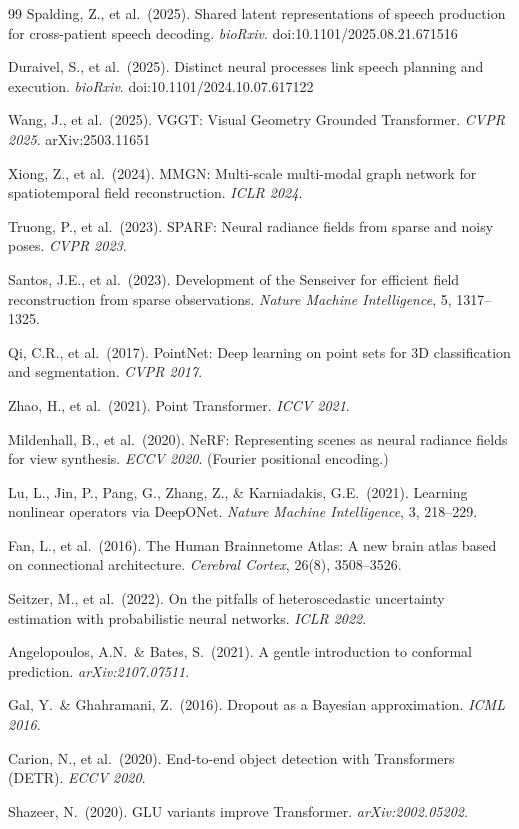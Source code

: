 \documentclass[11pt,letterpaper]{article}
\begin{document}
\begin{thebibliography}{99}
Spalding, Z., et al.\ (2025).
Shared latent representations of speech production for cross-patient speech decoding.
\textit{bioRxiv}. doi:10.1101/2025.08.21.671516

Duraivel, S., et al.\ (2025).
Distinct neural processes link speech planning and execution.
\textit{bioRxiv}. doi:10.1101/2024.10.07.617122

Wang, J., et al.\ (2025).
VGGT: Visual Geometry Grounded Transformer.
\textit{CVPR 2025}. arXiv:2503.11651

Xiong, Z., et al.\ (2024).
MMGN: Multi-scale multi-modal graph network for spatiotemporal field reconstruction.
\textit{ICLR 2024}.

Truong, P., et al.\ (2023).
SPARF: Neural radiance fields from sparse and noisy poses.
\textit{CVPR 2023}.

Santos, J.E., et al.\ (2023).
Development of the Senseiver for efficient field reconstruction from sparse observations.
\textit{Nature Machine Intelligence}, 5, 1317--1325.

Qi, C.R., et al.\ (2017).
PointNet: Deep learning on point sets for 3D classification and segmentation.
\textit{CVPR 2017}.

Zhao, H., et al.\ (2021).
Point Transformer.
\textit{ICCV 2021}.

Mildenhall, B., et al.\ (2020).
NeRF: Representing scenes as neural radiance fields for view synthesis.
\textit{ECCV 2020}. (Fourier positional encoding.)

Lu, L., Jin, P., Pang, G., Zhang, Z., \& Karniadakis, G.E.\ (2021).
Learning nonlinear operators via DeepONet.
\textit{Nature Machine Intelligence}, 3, 218--229.

Fan, L., et al.\ (2016).
The Human Brainnetome Atlas: A new brain atlas based on connectional architecture.
\textit{Cerebral Cortex}, 26(8), 3508--3526.

Seitzer, M., et al.\ (2022).
On the pitfalls of heteroscedastic uncertainty estimation with probabilistic neural networks.
\textit{ICLR 2022}.

Angelopoulos, A.N.\ \& Bates, S.\ (2021).
A gentle introduction to conformal prediction.
\textit{arXiv:2107.07511}.

Gal, Y.\ \& Ghahramani, Z.\ (2016).
Dropout as a Bayesian approximation.
\textit{ICML 2016}.

Carion, N., et al.\ (2020).
End-to-end object detection with Transformers (DETR).
\textit{ECCV 2020}.

Shazeer, N.\ (2020).
GLU variants improve Transformer.
\textit{arXiv:2002.05202}.

\end{thebibliography}
\end{document}
